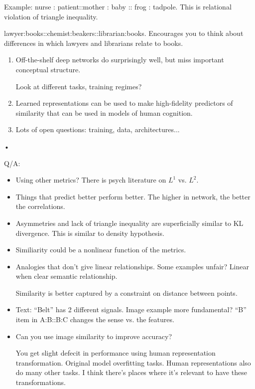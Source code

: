 Example: nurse : patient::mother : baby :: frog : tadpole.
This is relational violation of triangle inequality.

lawyer:books::chemist:beakers::librarian:books. Encourages you to think about differences in which lawyers and librarians relate to books.

\begin{enumerate}
\item
Off-the-shelf deep networks do surprisingly well, but miss important conceptual structure. 

Look at  different tasks, training regimes?
\item
Learned representations can be used to make high-fidelity predictors of similarity that can be used in models of human cognition.
\item
Lots of open questions: training, data, architectures...
\end{enumerate}•



Q/A:
\begin{itemize}
\item
Using other metrics?
There is psych literature on $L^1$ vs. $L^2$.

\item
Things that predict better perform better. The higher in network, the better the correlations. 
\item
Asymmetries and lack of triangle inequality are superficially similar to KL divergence. This is similar to density hypothesis.


\item
Similiarity could be a nonlinear function of the metrics.
\item
Analogies that don't give linear relationships. Some examples unfair? Linear when clear semantic relationship. 

Similarity is better captured by a constraint on distance between points.
\item
Text: ``Belt'' has 2 different signals. Image example more fundamental? ``B'' item in A:B::B:C changes the sense vs. the features. 
\item Can you use image similarity to improve accuracy? 

You get slight defecit in performance using human representation transformation. Original model overfitting tasks. Human representations also do many other tasks.
I think there's places where it's relevant to have these transformations.
\end{itemize}


